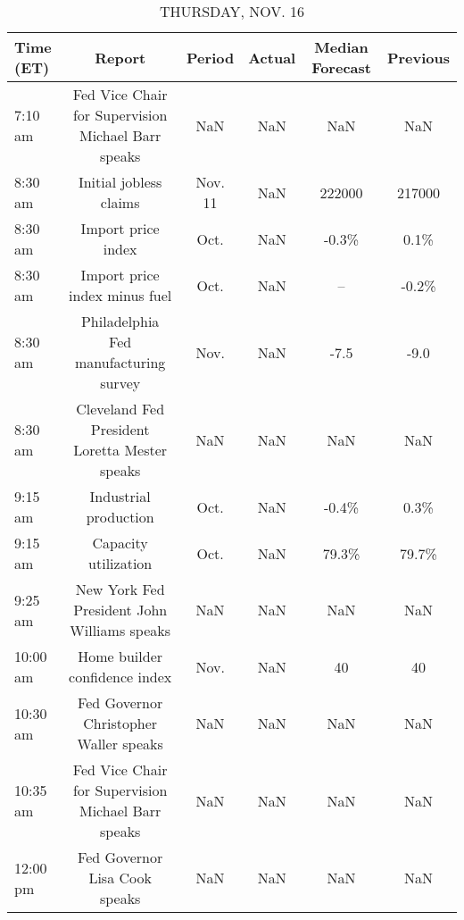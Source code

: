 \documentclass{article}%
\begin{document}
\begin{table}[htbp]%
\caption{THURSDAY, NOV. 16}%
\centering%
\begin{adjustbox}{width=1\textwidth}%
\begin{tabular}{lccccc}
\toprule
Time (ET) &                                             Report &  Period & Actual & Median Forecast & Previous \\
\midrule
  7:10 am & Fed Vice Chair for Supervision Michael Barr speaks &     NaN &    NaN &             NaN &      NaN \\
  8:30 am &                             Initial jobless claims & Nov. 11 &    NaN &          222000 &   217000 \\
  8:30 am &                                 Import price index &    Oct. &    NaN &           -0.3\% &     0.1\% \\
  8:30 am &                      Import price index minus fuel &    Oct. &    NaN &              -- &    -0.2\% \\
  8:30 am &              Philadelphia Fed manufacturing survey &    Nov. &    NaN &            -7.5 &     -9.0 \\
  8:30 am &      Cleveland Fed President Loretta Mester speaks &     NaN &    NaN &             NaN &      NaN \\
  9:15 am &                              Industrial production &    Oct. &    NaN &           -0.4\% &     0.3\% \\
  9:15 am &                               Capacity utilization &    Oct. &    NaN &           79.3\% &    79.7\% \\
  9:25 am &        New York Fed President John Williams speaks &     NaN &    NaN &             NaN &      NaN \\
 10:00 am &                      Home builder confidence index &    Nov. &    NaN &              40 &       40 \\
 10:30 am &             Fed Governor Christopher Waller speaks &     NaN &    NaN &             NaN &      NaN \\
 10:35 am & Fed Vice Chair for Supervision Michael Barr speaks &     NaN &    NaN &             NaN &      NaN \\
 12:00 pm &                      Fed Governor Lisa Cook speaks &     NaN &    NaN &             NaN &      NaN \\
\bottomrule
\end{tabular}
%
\end{adjustbox}%
\end{table}
\end{document}
